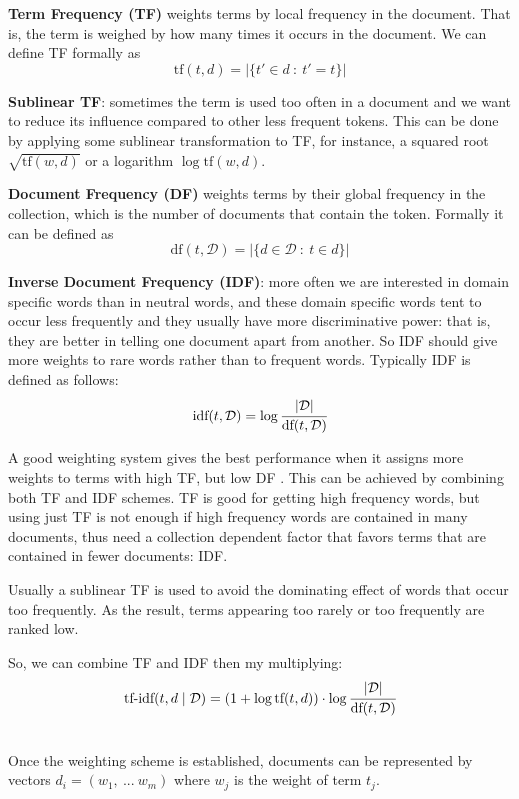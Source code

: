 \textbf{Term Frequency (TF)} weights terms by local frequency in the document.
That is, the term is weighed by how many times it occurs in the document.
We can define TF formally as
$$\text{tf}(t, d) = \big| \{ t' \in d  \ : \ t' = t \} \big|$$


\textbf{Sublinear TF}: sometimes the term is used too often in
a document and we want to reduce its influence compared to
other less frequent tokens. This can be done by applying
some sublinear transformation to TF, for instance, a squared root
$\sqrt{\text{tf}(w, d)}$ or a logarithm $\log \text{tf}(w, d)$.


\textbf{Document Frequency (DF)} weights terms by their global frequency
in the collection, which is the number of documents that contain the token.
Formally it can be defined as
$$\text{df}(t, \mathcal D) = \big| \{ d \in \mathcal D \ : \  t \in d \} \big|$$


\textbf{Inverse Document Frequency (IDF)}: more often we are interested
in domain specific words than in neutral words, and these domain specific
words tent to occur less frequently and they usually have more discriminative
power: that is, they are better in telling one document apart from another.
So IDF should give more weights to rare words rather than to frequent words.
Typically IDF is defined as follows:
$$\text{idf}(t, \mathcal D) = \log \cfrac{ |\mathcal D| }{\text{df}(t, \mathcal D)}$$


A good weighting system gives the best performance when it assigns 
more weights to terms with high TF, but low DF \cite{salton1988term}.
This can be achieved by combining both TF and IDF
schemes. TF is good for getting high frequency words, but using
just TF is not enough if high frequency words are contained in
many documents, thus need a collection dependent factor that favors
terms that are contained in fewer documents: IDF.

Usually a sublinear TF is used to avoid the dominating effect of
words that occur too frequently. As the result, terms appearing
too rarely or too frequently are ranked low.

So, we can combine TF and IDF then my multiplying:
$$\text{tf-idf}(t, d \mid \mathcal D) = (1 + \log \text{tf}(t, d)) \cdot \log \cfrac{|\mathcal D|}{\text{df}(t, \mathcal D)}$$


\ \\

Once the weighting scheme is established, documents can be represented
by vectors $d_i = (w_1, \ ... \ w_m)$ where $w_j$ is the weight of term
$t_j$.

